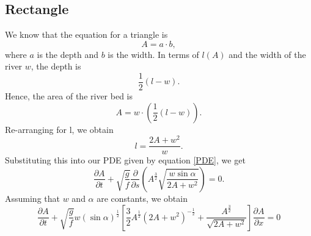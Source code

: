 \documentclass[12pt]{article}
\begin{document}
\subsection{Rectangle}
We know that the equation for a triangle is
\begin{equation}
    A = a \cdot b,
\end{equation}
where $a$ is the depth and $b$ is the width.  In terms of $l(A)$ and the width of the river $w$, the depth is
\begin{equation}
    \frac{1}{2}(l-w).
\end{equation}
Hence, the area of the river bed is
\begin{equation}
    A=w\cdot \left(\frac{1}{2}(l-w)\right).
\end{equation}
Re-arranging for l, we obtain
\begin{equation}
    l = \frac{2A+w^2}{w}.
\end{equation}
Substituting this into our PDE given by equation \ref{PDE}, we get
\begin{equation}
    \frac{\partial A}{\partial t} + \sqrt{\frac{g}{f}}\frac{\partial}{\partial s}\left(A^{\frac{3}{2}}\sqrt{\frac{w\sin\alpha}{2A+w^2}}\right) = 0.
\end{equation}
Assuming that $w$ and $\alpha$ are constants, we obtain
\begin{equation}
    \frac{\partial A}{\partial t} + \sqrt{\frac{g}{f}}w(\sin\alpha)^{\frac{1}{2}}\left[\frac{3}{2}A^{\frac{1}{2}}(2A+w^2)^{-\frac{1}{2}}+ \frac{A^{\frac{3}{2}}}{\sqrt{2A+w^2}}\right] \frac{\partial A}{\partial x} = 0
\end{equation}
\end{document}
